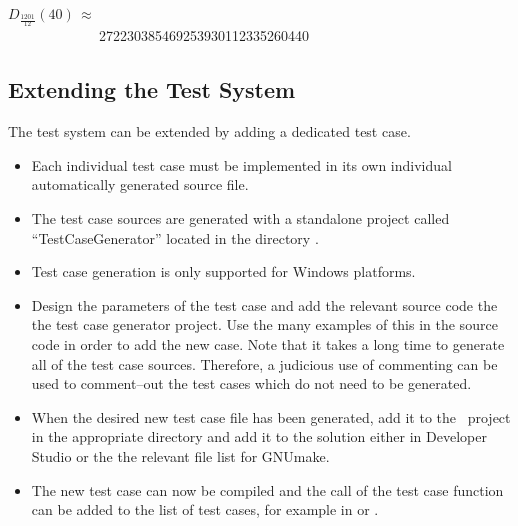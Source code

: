 \vspace{5.0pt}

{\raggedright
$D_{\frac{1201}{12}}\left(40\right)\,\approx\,$
{
\nopagebreak
\\ \ \ \ \ \ \ \ \ \ \ \ \ \ 
272230385469253930112335260440}
}

\subsection{Extending the Test System}

The test system can be extended by adding a dedicated test case.

\begin{itemize}
\item Each individual test case must be implemented in its own individual
automatically generated source file.
\item The test case sources are generated with a standalone project
called ``Test\-Case\-Generator'' located in the directory
{}.
\item Test case generation is only supported for
Windows{\footnotesize {\textregistered}} platforms.
\item Design the parameters of the test case and add the relevant
source code the the test case generator project. Use the many examples
of this in the source code in order to add the new case.
Note that it takes a long time to generate all of the test case
sources. Therefore, a judicious use of commenting can be used to
comment--out the test cases which do not need to be generated.
\item When the desired new test case file has been generated, add it
to the \efloat\ project in the appropriate directory and add it to the
solution either in Developer Studio or the the relevant file list
for GNUmake.
\item The new test case can now be compiled and the call of the
test case function can be added to the list of test cases, for example
in {\courier{test\underline\ real.cpp}} or {}.
\end{itemize}

